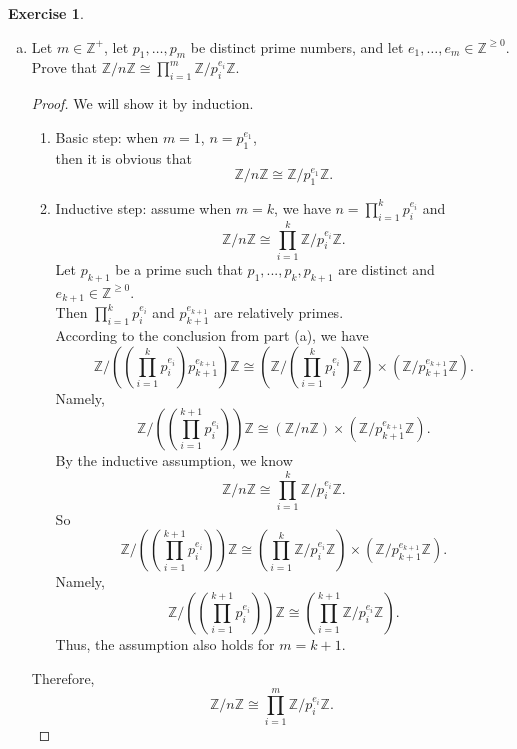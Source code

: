 \documentclass{amsart}
\newcommand{\bbz}{\mathbb{Z}}
\theoremstyle{plain}
\theoremstyle{definition}
\newtheorem{exer}[lem]{Exercise}
\begin{document}
\begin{exer}
\begin{enumerate}[(a)]
\item Let $m\in\bbz^+$, let $p_1,\ldots,p_m$ be distinct prime numbers, and let $e_1,\ldots,e_m\in\bbz^{\geq 0}$.
Prove that
$\bbz/n\bbz\cong\prod_{i=1}^m\bbz/p_i^{e_i}\bbz$.
\begin{proof}
We will show it by induction.
\begin{enumerate}[(1)]
	\item
		Basic step: when $m=1$, $n=p_1^{e_1}$, \\
		then it is obvious that 
		\[ \bbz / n\bbz \cong \bbz/p_1^{e_1}\bbz.\]
	\item
	  Inductive step: assume when $m=k$, we have $n = \prod_{i=1}^kp_i^{e_i}$ and 
	  \[ \bbz / n\bbz \cong \prod_{i=1}^k\bbz/p_i^{e_i}\bbz.\]
	  Let $p_{k+1}$ be a prime such that $p_1,...,p_k,p_{k+1}$ are distinct and $e_{k+1} \in \bbz^{\geq 0}$.\\
	  Then $\prod_{i=1}^kp_i^{e_i}$ and $p_{k+1}^{e_{k+1}}$ are relatively primes.\\
	  According to the conclusion from part (a), we have 
	  \[\bbz/ \left(\left( \prod_{i=1}^kp_i^{e_i} \right) p_{k+1}^{e_{k+1}} \right)\bbz\cong \left(\bbz/\left( \prod_{i=1}^kp_i^{e_i} \right) \bbz \right)\times \left(\bbz/ p_{k+1}^{e_{k+1}} \bbz\right).\]
	  Namely,
	\[\bbz/ \left(\left( \prod_{i=1}^{k+1}p_i^{e_i} \right) \right)\bbz\cong ( \bbz /n\bbz )\times \left(\bbz/ p_{k+1}^{e_{k+1}} \bbz\right).\]
	  By the inductive assumption, we know
	  \[ \bbz / n\bbz \cong \prod_{i=1}^k\bbz/p_i^{e_i}\bbz.\]
	  So
	  \[\bbz/ \left(\left( \prod_{i=1}^{k+1}p_i^{e_i} \right) \right)\bbz\cong \left( \prod_{i=1}^k\bbz/p_i^{e_i}\bbz \right)\times \left(\bbz/ p_{k+1}^{e_{k+1}} \bbz\right).\]
	  Namely,
	  \[\bbz/ \left(\left( \prod_{i=1}^{k+1}p_i^{e_i} \right) \right)\bbz\cong \left( \prod_{i=1}^{k+1}\bbz/p_i^{e_i}\bbz \right).\] 
	  Thus, the assumption also holds for $m=k+1$.\\ 
\end{enumerate}
    Therefore,
	\[ \bbz/n\bbz\cong\prod_{i=1}^m\bbz/p_i^{e_i}\bbz.\]
\end{proof}

\end{enumerate}
\end{exer}

\newpage
\end{document}
